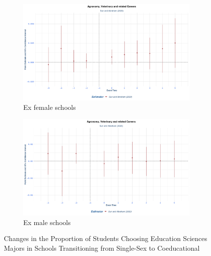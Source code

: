 \begin{figure}[H]
    \centering
    \begin{subfigure}[b]{0.45\textwidth}
        \centering
        \includegraphics[width=\textwidth]{Graph/Results/stagered_ex_females_AGRONOMY_VETERINARY_RELATED.png}
        \caption{Ex female schools }
        \label{fig:staggered_females_education_sciences1}
    \end{subfigure}
    \hfill
    \begin{subfigure}[b]{0.45\textwidth}
        \centering
        \includegraphics[width=\textwidth]{Graph/Results/stagered_ex_males_AGRONOMY_VETERINARY_RELATED.png}
        \caption{Ex male schools}
        \label{fig:staggered_males_education_sciences2}
    \end{subfigure}
       \caption{ Changes in the Proportion of Students Choosing Education Sciences Majors  in Schools Transitioning from Single-Sex to Coeducational}
    \label{fig:staggered_education_sciences1}
\end{figure}

